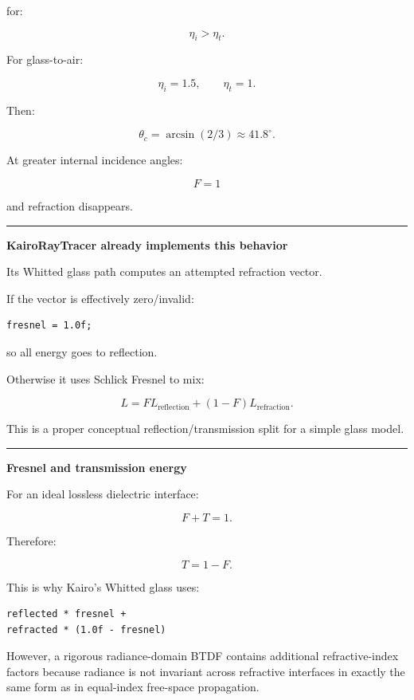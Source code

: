 for:

\[
\eta_i>\eta_t.
\]

For glass-to-air:

\[
\eta_i=1.5,
\qquad
\eta_t=1.
\]

Then:

\[
\theta_c=
\arcsin(2/3)
\approx41.8^\circ.
\]

At greater internal incidence angles:

\[
\boxed{
F=1
}
\]

and refraction disappears.

\begin{center}\rule{0.5\linewidth}{0.5pt}\end{center}

\textbf{KairoRayTracer already implements this behavior}

Its Whitted glass path computes an attempted refraction vector.

If the vector is effectively zero/invalid:

\begin{verbatim}
fresnel = 1.0f;
\end{verbatim}

so all energy goes to reflection.

Otherwise it uses Schlick Fresnel to mix:

\[
L=
F L_{\text{reflection}}
+
(1-F)L_{\text{refraction}}.
\]

This is a proper conceptual reflection/transmission split for a simple glass model.

\begin{center}\rule{0.5\linewidth}{0.5pt}\end{center}

\textbf{Fresnel and transmission energy}

For an ideal lossless dielectric interface:

\[
\boxed{
F+T=1.
}
\]

Therefore:

\[
T=1-F.
\]

This is why Kairo's Whitted glass uses:

\begin{verbatim}
reflected * fresnel +
refracted * (1.0f - fresnel)
\end{verbatim}

However, a rigorous radiance-domain BTDF contains additional refractive-index factors because radiance is not invariant across refractive interfaces in exactly the same form as in equal-index free-space propagation.

